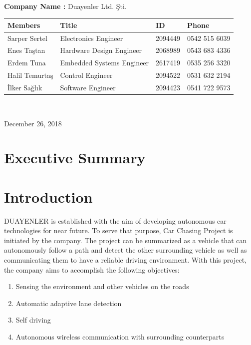\documentclass[a4paper,12pt]{article}
\begin{document}
\begin{titlepage}
\begin{minipage}[r]{0.35\textwidth}
\end{minipage}\\[1cm]
\begin{minipage}{\textwidth}
	\begin{flushleft}
		\large{\textbf{Company Name :}}	Duayenler Ltd. Şti.\\
		\begin{table}[H]
			\begin{tabular}{l l l l}
				\hline
				\textbf{Members}&\textbf{Title}& \textbf{ID}&\textbf{Phone} \\ \hline
				Sarper Sertel & Electronics Engineer& 2094449 & 0542 515 6039  \\ 
				Enes Taştan & Hardware Design Engineer & 2068989 & 0543 683 4336  \\ 
				Erdem Tuna & Embedded Systems Engineer& 2617419 & 0535 256 3320  \\ 
				Halil Temurtaş & Control Engineer& 2094522 & 0531 632 2194  \\
				İlker Sağlık & Software Engineer& 2094423 & 0541 722 9573  \\ \hline
				
				
			\end{tabular}
		\end{table}
	\end{flushleft}
\end{minipage}\\[1cm]

\begin{flushbottom}
{\large December 26, 2018} %
\end{flushbottom}

\end{titlepage}

\blankpage
\tableofcontents
\newpage

\section{Executive Summary}

	

\section{Introduction}
	DUAYENLER is established with the aim of developing autonomous car technologies for near future. To serve that purpose,  Car Chasing Project is initiated by the company. The project can be summarized as a vehicle that can autonomously follow a path and detect the other surrounding vehicle as well as communicating them to have a reliable driving environment.  With this project, the company aims to accomplish the following objectives:
	\begin{enumerate}
		\item Sensing the environment and other vehicles on the roads
		\item Automatic adaptive lane detection
		\item Self driving
		\item Autonomous wireless communication with surrounding counterparts		
	\end{enumerate}
	
\end{document}
